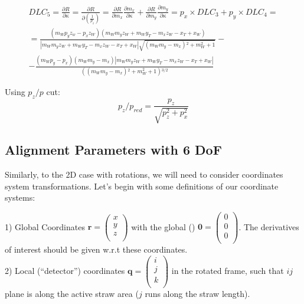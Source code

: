 \documentclass[a4paper,11pt]{article}
\begin{document}
\begin{equation}
\begin{split}
DLC_5 = \frac{ \partial R}{\partial \kappa} = \frac{ \partial R}{\partial \left(\frac{1}{p_z}\right)} = \frac{ \partial R}{\partial m_x}\frac{ \partial m_x}{\partial \kappa} + \frac{ \partial R}{\partial m_y}\frac{ \partial m_y}{\partial \kappa} = p_x \times DLC_3 + p_y \times DLC_4 = \\
= \frac{(m_W p_y z_w-p_x z_W)(m_W m_y z_W+m_W y_T-m_x z_W-x_T+x_W)}{|m_W m_y z_W+m_W y_T-m_x z_W-x_T+x_W|\sqrt{\left(m_W m_y-m_x\right){}^2+m_W^2+1}} - \\
-\frac{\left(m_W p_y-p_x\right) \left(m_W m_y-m_x\right) |m_W m_y z_W+m_W y_T-m_x z_W-x_T+x_W|}{\left(\left(m_W m_y-m_x\right){}^2+m_W^2+1\right){}^{3/2}}
\end{split}
\end{equation}


Using  $p_z/p$ cut:
\begin{equation}
p_z/p_{red} = \frac{p_z}{\sqrt{p_z^2+p_x^2}}
\end{equation}

\subsection{Alignment Parameters with 6 DoF}

Similarly, to the 2D case with rotations, we will need to consider coordinates system transformations. Let's begin with some definitions of our coordinate systems: 

1) Global Coordinates $\textbf{r}=\begin{pmatrix}x\\y\\z\\\end{pmatrix}$ with the global () $\textbf{0}=\begin{pmatrix}0\\0\\0\\\end{pmatrix}$. The derivatives of interest should be given w.r.t these coordinates. \\
2) Local (“detector”) coordinates  $\textbf{q}=\begin{pmatrix}i\\j\\k\\\end{pmatrix}$ in the rotated frame, such that $ij$ plane is along the active straw area ($j$ runs along the straw length). \\
\end{document}
